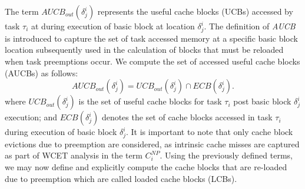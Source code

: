 \noindent The term \begin{math}\textit{AUCB}_{out}(\delta_{j}^{i})\end{math} represents the useful cache blocks (UCBs) accessed by task \begin{math}\tau_{i}\end{math} at during execution of basic block at location \begin{math}\delta_{j}^{i}\end{math}. The definition of \textit{AUCB} is introduced to capture the set of task accessed memory at a specific basic block location subsequently used in the calculation of blocks that must be reloaded when task preemptions occur.  We compute the set of accessed useful cache blocks (AUCBs) as follows:
\begin{equation}\label{eqn:aucb-formula}
    \textit{AUCB}_{out}(\delta_{j}^{i}) = \textit{UCB}_{out}(\delta_{j}^{i}) \cap \textit{ECB}(\delta_{j}^{i}).
\end{equation}
\noindent where \begin{math}\textit{UCB}_{out}(\delta_{j}^{i})\end{math} is the set of useful cache blocks for task \begin{math}\tau_{i}\end{math} post basic block \begin{math}\delta_{j}^{i}\end{math} execution; and \begin{math}\textit{ECB}(\delta_{j}^{i})\end{math} denotes the set of cache blocks accessed in task \begin{math}\tau_{i}\end{math} during execution of basic block \begin{math}\delta_{j}^{i}\end{math}. It is important to note that only cache block evictions due to preemption are considered, as intrinsic cache misses are captured as part of WCET analysis in the term \begin{math}C_{i}^{NP}\end{math}.  Using the previously defined terms, we may now define and explicitly compute the cache blocks that are re-loaded due to preemption which are called loaded cache blocks (LCBs).

